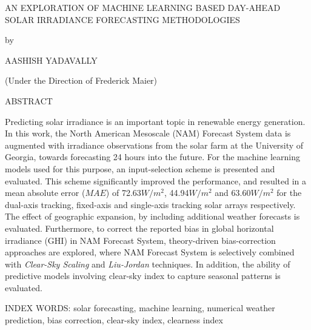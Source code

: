 \thispagestyle{empty}
\begin{center}
    AN EXPLORATION OF MACHINE LEARNING BASED DAY-AHEAD SOLAR IRRADIANCE FORECASTING METHODOLOGIES
    
    by
    
    AASHISH YADAVALLY
    
    (Under the Direction of Frederick Maier)
    
    ABSTRACT
\end{center}
Predicting solar irradiance is an important topic in renewable energy generation. In this work, the North American Mesoscale (NAM) Forecast System data is augmented with irradiance observations from the solar farm at the University of Georgia, towards forecasting 24 hours into the future. For the machine learning models used for this purpose, an input-selection scheme is presented and evaluated. This scheme significantly improved the performance, and resulted in a mean absolute error ($MAE$) of 72.63$W/m^2$, 44.94$W/m^2$ and 63.60$W/m^2$ for the dual-axis tracking, fixed-axis and single-axis tracking solar arrays respectively. The effect of geographic expansion, by including additional weather forecasts is evaluated. Furthermore, to correct the reported bias in global horizontal irradiance (GHI) in NAM Forecast System, theory-driven bias-correction approaches are explored, where NAM Forecast System is selectively combined with \textit{Clear-Sky Scaling} and \textit{Liu-Jordan} techniques. In addition, the ability of predictive models involving clear-sky index to capture seasonal patterns is evaluated.

\vspace{3\baselineskip}
\noindent
INDEX WORDS: solar forecasting, machine learning, numerical weather prediction, bias correction, clear-sky index, clearness index

\newpage